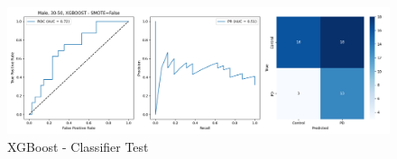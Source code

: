 \documentclass[12pt]{report}
\begin{document}
                \begin{figure}[H]
                    \centering
                    \includegraphics[width=1\textwidth]{ML/Predict/DEG/AUC/results_stratified_Male_30-50_XGBOOST_useSMOTE_False.png}
                    \caption*{XGBoost - Classifier Test}
                    \label{fig:app_xgb_males_30_50_test}
                \end{figure}                 
\end{document}
